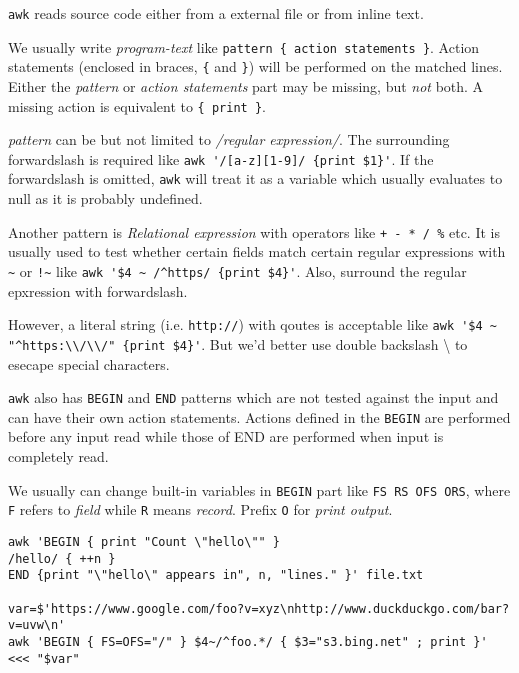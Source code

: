 \lstinline|awk| reads source code either from a external file or
from inline text.

We usually write \textit{program-text} like
\verb|pattern { action statements }|. Action statements (enclosed
in braces, \lstinline|{| and \lstinline|}|) will be performed on
the matched lines. Either the \textit{pattern} or \textit{action
  statements} part may be missing, but \textit{not} both. A
missing action is equivalent to \lstinline|{ print }|.

\textit{pattern} can be but not limited to \textit{/regular
  expression/}. The surrounding forwardslash is required like
\lstinline|awk '/[a-z][1-9]/ {print $1}'|. If the forwardslash is
omitted, \lstinline|awk| will treat it as a variable which usually
evaluates to null as it is probably undefined.

Another pattern is \textit{Relational expression} with operators
like \lstinline|+ - * / %| etc. It is
usually used to test whether certain fields match certain regular
expressions with \lstinline|~| or \lstinline|!~| like
\lstinline|awk '$4 ~ /^https/ {print $4}'|. Also, surround the
regular epxression with forwardslash.

However, a literal string (i.e. \texttt{http://}) with qoutes is
acceptable like \lstinline|awk '$4 ~ "^https:\\/\\/" {print $4}'|.
But we'd better use double backslash \textbackslash{} to
esecape special characters.

\lstinline|awk| also has \verb|BEGIN| and \verb|END| patterns
which are not tested against the input and can have their own
action statements. Actions defined in the \verb|BEGIN| are
performed before any input read while those of END are performed
when input is completely read.

We usually can change built-in variables in \verb|BEGIN| part like
\verb|FS RS OFS ORS|, where \verb|F| refers to \textit{field}
while \verb|R| means \textit{record}. Prefix \verb|O| for
\textit{print output}.

\begin{lstlisting}
awk 'BEGIN { print "Count \"hello\"" }
/hello/ { ++n }
END {print "\"hello\" appears in", n, "lines." }' file.txt

var=$'https://www.google.com/foo?v=xyz\nhttp://www.duckduckgo.com/bar?v=uvw\n'
awk 'BEGIN { FS=OFS="/" } $4~/^foo.*/ { $3="s3.bing.net" ; print }' <<< "$var"
\end{lstlisting}

